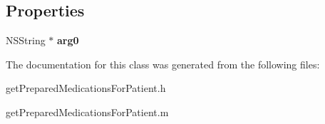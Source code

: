 \subsection*{Properties}
\begin{DoxyCompactItemize}
\item 
\hypertarget{interfaceget_prepared_medications_for_patient_a5a75809c7a935c7d3df839ddf9194fe9}{}N\+S\+String $\ast$ {\bfseries arg0}\label{interfaceget_prepared_medications_for_patient_a5a75809c7a935c7d3df839ddf9194fe9}

\end{DoxyCompactItemize}


The documentation for this class was generated from the following files\+:\begin{DoxyCompactItemize}
\item 
get\+Prepared\+Medications\+For\+Patient.\+h\item 
get\+Prepared\+Medications\+For\+Patient.\+m\end{DoxyCompactItemize}

